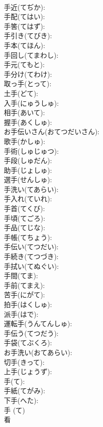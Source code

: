 \documentclass[8pt]{extreport}
\begin{document}
\begin{CJK}{UTF8}{min}
\\	手近(てぢか): 
\\	手配(てはい): 
\\	手筈(てはず): 
\\	手引き(てびき): 
\\	手本(てほん): 
\\	手回し(てまわし): 
\\	手元(てもと): 
\\	手分け(てわけ): 
\\	取っ手(とって): 
\\	土手(どて): 
\\	入手(にゅうしゅ): 
\\	相手(あいて): 
\\	握手(あくしゅ): 
\\	お手伝いさん(おてつだいさん): 
\\	歌手(かしゅ): 
\\	手術(しゅじゅつ): 
\\	手段(しゅだん): 
\\	助手(じょしゅ): 
\\	選手(せんしゅ): 
\\	手洗い(てあらい): 
\\	手入れ(ていれ): 
\\	手首(てくび): 
\\	手頃(てごろ): 
\\	手品(てじな): 
\\	手帳(てちょう): 
\\	手伝い(てつだい): 
\\	手続き(てつづき): 
\\	手拭い(てぬぐい): 
\\	手間(てま): 
\\	手前(てまえ): 
\\	苦手(にがて): 
\\	拍手(はくしゅ): 
\\	派手(はで): 
\\	運転手(うんてんしゅ): 
\\	手伝う(てつだう): 
\\	手袋(てぶくろ): 
\\	お手洗い(おてあらい): 
\\	切手(きって): 
\\	上手(じょうず): 
\\	手(て): 
\\	手紙(てがみ): 
\\	下手(へた): 
\\	手 (て)
\\	看			

\end{CJK}
\end{document}
